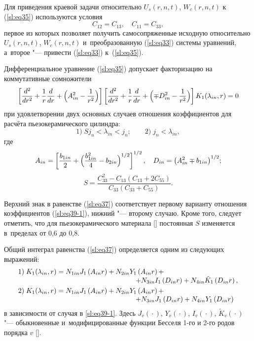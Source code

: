Для приведения краевой задачи относительно $U_s (r, n, t)$,  $W_c (r, n, t)$ к (\ref{sl:eq35}) используются условия 
\begin{equation}
\label{sl:eq36}
C_{12} =C_{13},  \quad
C_{11} =C_{33},
\end{equation}
первое из которых позволяет получить самосопряженные исходную относительно $U_s (r, n, t)$, $W_c (r, n, t)$ и~преобразованную 
(\ref{sl:eq33}) системы уравнений, а~второе "--- привести (\ref{sl:eq33}) к~(\ref{sl:eq35}).



Дифференциальное уравнение (\ref{sl:eq35}) допускает факторизацию на коммутативные сомножители
\begin{equation}
\label{sl:eq37}
\left[ \frac{d^2}{dr^2}+\frac{1}{r}\frac{d}{dr}+\Bigl( A_{in}^2 -   \frac{1}{r^2} \Bigr) \right]
\left[ \frac{d^2}{dr^2}+\frac{1}{r}\frac{d}{dr}+\Bigl(\mp D_{in}^2 -\frac{1}{r^2} \Bigr) \right]K_1 (\lambda_{in}, r)=0
\end{equation}
при удовлетворении двух основных случаев отношения коэффициентов для расчёта пьезокерамического цилиндра:
\begin{equation}
\label{sl:eq39-1}
1)\; S  j_n <\lambda _{in} <j_n; \qquad  2)\; j_n <\lambda _{in} ,
\end{equation}
где 
$$
A_{in} =\left[ \frac{b_{1in} }{2}+\Bigl(\frac{b_{1in}^2 }{4}-b_{2in}  \Bigr)^{1/2} \right]^{1/2},\quad 
D_{in} =\bigl(A_{in}^2 \mp b_{1in}  \bigr)^{1/2};$$ 
$$
S=\frac{C_{33}^2 -C_{13} (C_{13} +2C_{55} )}{C_{33} (C_{33} +C_{55} )}. $$

Верхний знак в равенстве (\ref{sl:eq37}) соответствует первому варианту отношения коэффициентов (\ref{sl:eq39-1}), нижний "--- второму случаю. 
Кроме того, следует отметить,  что для пьезокерамического материала [] постоянная $S$ изменяется в~пределах от 0,6 до 0,8.


Общий интеграл равенства (\ref{sl:eq37}) определяется одним из следующих выражений:
\begin{equation}
\label{sl:eq40-1}
\begin{array}{l}
1)\; K_1 (\lambda_{in}, r)=N_{1in} J_1 \left( {A_{in} r}  \right)+N_{2in} Y_1 \left( {A_{in} r} \right)+ \\
\hspace{6cm} +N_{3in} I_1 \left( {D_{in} r} 
\right)+N_{4in} \tilde {K}_1 \left( {D_{in} r} \right), \vspace{1mm}
\\
2) \; K_1 (\lambda_{in}, r)=N_{1in} J_1 \left( {A_{in} r} \right)+ N_{2in} Y_1 \left( {A_{in} r} \right)+\\
\hspace{6cm} + N_{3in} J_1 \left( {D_{in} r} 
\right)+N_{4in} Y_1 \left( {D_{in} r} \right)
\end{array}
\end{equation}
в зависимости от случая в \eqref{sl:eq39-1}.
Здесь $J_v ( {} \cdot {} )$, $Y_v ( {} \cdot {} )$, $I_v ( {} \cdot {} )$, $\tilde {K}_v ( {} \cdot {} )$ "--- обыкновенные и~модифицированные 
функции Бесселя 1-го и 2-го родов порядка $v$ [].


